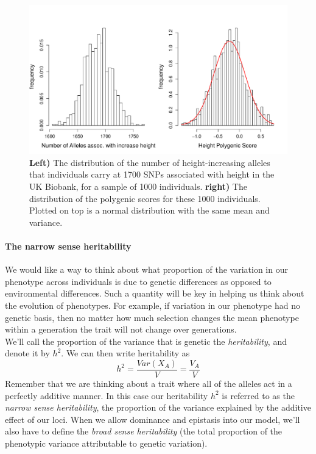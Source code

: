 \begin{figure}
\begin{center}
\includegraphics[width=\textwidth]{figures/Biobank_height_dist.pdf}
\end{center}
\caption{{\bf Left)} The distribution of the number of height-increasing alleles that individuals carry at 1700 SNPs associated with height in the UK Biobank, for a sample of 1000 individuals. {\bf right)} The distribution of the polygenic scores for these 1000 individuals. Plotted on top is a normal distribution with the same mean and variance. } \label{fig:Biobank_height_PGS}
\end{figure}
 

\paragraph{The narrow sense heritability}
We would like a way to think about what proportion of the variation
in our phenotype across individuals is due to genetic differences as
opposed to environmental differences. Such a quantity will be key in
helping us think about the evolution of phenotypes. For example, if
variation in our phenotype had no genetic basis, then no matter how
much selection changes the mean phenotype within a generation
the trait will not change over generations. \\

We'll call the proportion of the variance that is genetic the
\textit{heritability}, and denote it by $h^2$. We can then write heritability as
\begin{equation}
h^2 = \frac{Var(X_A)}{V} = \frac{V_A}{V}
\end{equation}
Remember that we are thinking about a trait where all of the alleles act
in a perfectly additive manner. In this case our heritability $h^2$ is
referred to as the \textit{narrow sense heritability}, the proportion of the
variance explained by the additive effect of our loci.
When we allow dominance
and epistasis into our model, we'll also have to define the \textit{broad sense
heritability} (the total proportion of the phenotypic variance
attributable to genetic variation).\\

